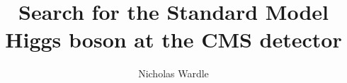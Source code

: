 \documentclass[a4paper,12pt,twoside]{report}
\begin{document}
\title{\LARGE {\bf Search for the Standard Model Higgs boson at the CMS detector}\\
 \vspace*{6mm}
}

\author{Nicholas Wardle}

\maketitle

\clearpage
\clearpage
\clearpage
\clearpage
\clearpage
\clearpage
\end{document}
